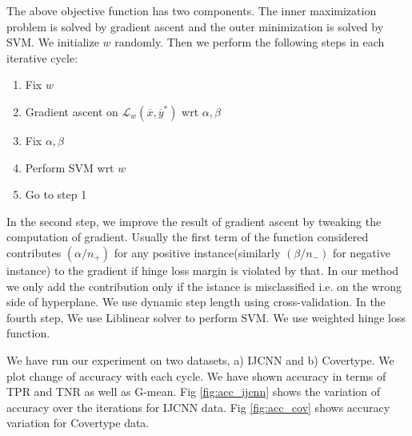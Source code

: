 \documentclass{article} %
\begin{document}
The above objective function has two components. The inner maximization problem is solved by gradient ascent and the outer minimization is solved by SVM. We initialize $w$ randomly. Then we perform the following steps in each iterative cycle:
\begin{enumerate}
	\item Fix $w$
	\item Gradient ascent on $\mathcal L_w(\overline{x},\overline{y}^*)$ wrt $\alpha,\beta$
	\item Fix $\alpha,\beta$
	\item Perform SVM wrt $w$
	\item Go to step 1
\end{enumerate}
In the second step, we improve the result of gradient ascent by tweaking the computation of gradient. Usually the first term of the function considered contributes $(\alpha/n_+)$ for any positive instance(similarly $(\beta/n_-)$ for negative instance) to the gradient if hinge loss margin is violated by that. In our method we only add the contribution only if the istance is misclassified i.e. on the wrong side of hyperplane. We use dynamic step length using cross-validation. In the fourth step, We use Liblinear solver to perform SVM. We use weighted hinge loss function.

We have run our experiment on two datasets, a) IJCNN and b) Covertype. We plot change of accuracy with each cycle. We have shown accuracy in terms of TPR and TNR as well as G-mean. Fig \ref{fig:acc_ijcnn} shows the variation of accuracy over the iterations for IJCNN data. Fig \ref{fig:acc_cov} shows accuracy variation for Covertype data.
\end{document}
